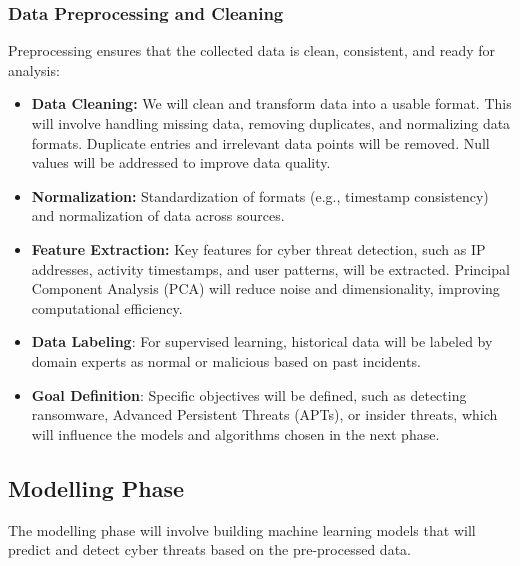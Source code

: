 \documentclass[a4paper,twoside,12pt]{report}
\begin{document}
\subsubsection{Data Preprocessing and Cleaning}

Preprocessing ensures that the collected data is clean, consistent, and ready for analysis:

\begin{itemize}
    \item \textbf{Data Cleaning:} We will clean and transform data into a usable format. This will involve handling missing data, removing duplicates, and normalizing data formats. Duplicate entries and irrelevant data points will be removed. Null values will be addressed to improve data quality. 
    
    \item \textbf{Normalization:} Standardization of formats (e.g., timestamp consistency) and normalization of data across sources.
    
    \item \textbf{Feature Extraction:} Key features for cyber threat detection, such as IP addresses, activity timestamps, and user patterns, will be extracted. Principal Component Analysis (PCA) will reduce noise and dimensionality, improving computational efficiency.
\end{itemize}


\begin{itemize}
    \item \textbf{Data Labeling}: For supervised learning, historical data will be labeled by domain experts as normal or malicious based on past incidents.
    \item \textbf{Goal Definition}: Specific objectives will be defined, such as detecting ransomware, Advanced Persistent Threats (APTs), or insider threats, which will influence the models and algorithms chosen in the next phase.
\end{itemize}

\subsection{Modelling Phase} 
The modelling phase will involve building machine learning models that will predict and detect cyber threats based on the pre-processed data.
\end{document}
